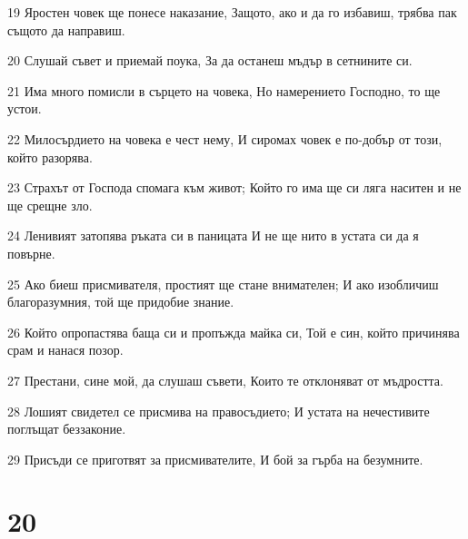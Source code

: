 \par 19 Яростен човек ще понесе наказание, Защото, ако и да го избавиш, трябва пак същото да направиш.
\par 20 Слушай съвет и приемай поука, За да останеш мъдър в сетнините си.
\par 21 Има много помисли в сърцето на човека, Но намерението Господно, то ще устои.
\par 22 Милосърдието на човека е чест нему, И сиромах човек е по-добър от този, който разорява.
\par 23 Страхът от Господа спомага към живот; Който го има ще си ляга наситен и не ще срещне зло.
\par 24 Ленивият затопява ръката си в паницата И не ще нито в устата си да я повърне.
\par 25 Ако биеш присмивателя, простият ще стане внимателен; И ако изобличиш благоразумния, той ще придобие знание.
\par 26 Който опропастява баща си и пропъжда майка си, Той е син, който причинява срам и нанася позор.
\par 27 Престани, сине мой, да слушаш съвети, Които те отклоняват от мъдростта.
\par 28 Лошият свидетел се присмива на правосъдието; И устата на нечестивите поглъщат беззаконие.
\par 29 Присъди се приготвят за присмивателите, И бой за гърба на безумните.

\chapter{20}

